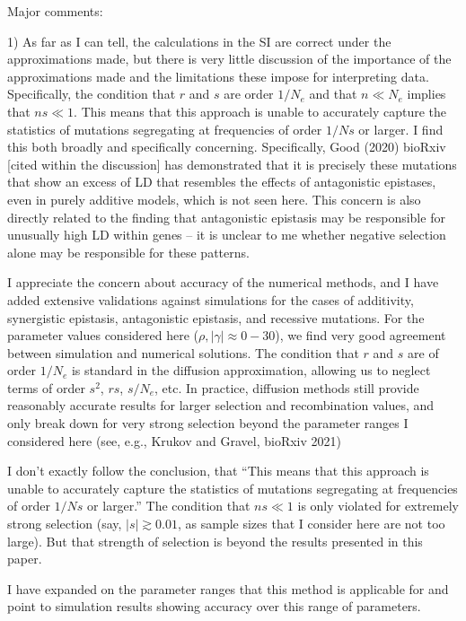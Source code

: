 \documentclass{article}
\newenvironment{response}%
  {\list{}{\leftmargin=0.5in\rightmargin=0.5in\color{blue}}\item[]}%
  {\endlist}
\begin{document}
Major comments:

1) As far as I can tell, the calculations in the SI are correct under the
approximations made, but there is very little discussion of the importance of
the approximations made and the limitations these impose for interpreting data.
Specifically, the condition that $r$ and $s$ are order $1/N_e$ and that $n \ll
N_e$ implies that $ns \ll 1$. This means that this approach is unable to
accurately capture the statistics of mutations segregating at frequencies of
order $1/Ns$ or larger. I find this both broadly and specifically concerning.
Specifically, Good (2020) bioRxiv [cited within the discussion] has
demonstrated that it is precisely these mutations that show an excess of LD
that resembles the effects of antagonistic epistases, even in purely additive
models, which is not seen here. This concern is also directly related to the
finding that antagonistic epistasis may be responsible for unusually high LD
within genes -- it is unclear to me whether negative selection alone may be
responsible for these patterns.

\begin{response}
    I appreciate the concern about accuracy of the numerical methods, and I
    have added extensive validations against simulations for the cases
    of additivity, synergistic epistasis, antagonistic epistasis, and recessive
    mutations. For the parameter values considered here
    ($\rho, |\gamma| \approx 0 - 30$), we find very good agreement between simulation
    and numerical solutions. The condition that $r$ and $s$ are of order $1/N_e$
    is standard in the diffusion approximation, allowing us to neglect terms
    of order $s^2$, $rs$, $s/N_e$, etc. In practice, diffusion methods still
    provide reasonably accurate results for larger selection and recombination
    values, and only break down for very strong
    selection beyond the parameter ranges I considered here
    (see, e.g., Krukov and Gravel, bioRxiv 2021)

    I don't exactly follow the conclusion, that ``This means that this approach
    is unable to accurately capture the statistics of mutations segregating at
    frequencies of order $1/Ns$ or larger.'' The condition that $ns\ll 1$ is only
    violated for extremely strong selection (say, $|s| \gtrsim 0.01$, as sample sizes
    that I consider here are not too large). But that strength of selection is beyond
    the results presented in this paper.

    I have expanded on the parameter ranges that this method is applicable for
    and point to simulation results showing accuracy over this range of parameters.
\end{response}
\end{document}
